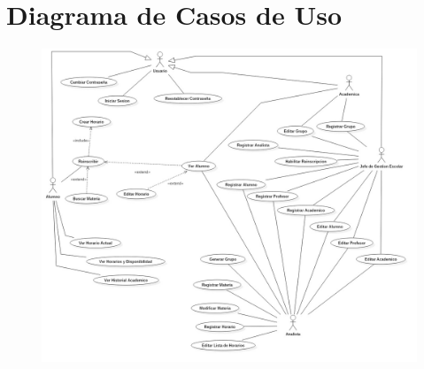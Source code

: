 \chapter{Diagrama de Casos de Uso}
\begin{figure}[H]
  \centering
    \includegraphics[scale=0.42, angle=90]{project/images/CU.jpg}
\end{figure}